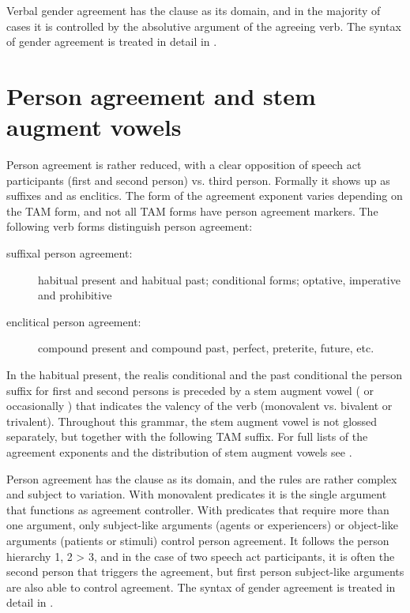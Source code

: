 Verbal gender agreement has the clause as its domain, and in the majority of cases it is controlled by the absolutive argument of the agreeing verb. The syntax of gender agreement is treated in detail in .



\section{Person agreement and stem augment vowels}
\label{sec:Stem augment vowels and person agreement}

Person agreement is rather reduced, with a clear opposition of speech act participants (first and second person) vs. third person. Formally it shows up as suffixes and as enclitics. The form of the agreement exponent varies depending on the TAM form, and not all TAM forms have person agreement markers. The following verb forms distinguish person agreement:
%
\begin{description}
	\item[suffixal person agreement:] habitual present and habitual past; conditional forms; optative, imperative and prohibitive
	\item[enclitical person agreement:] compound present and compound past, perfect, preterite, future, etc.
\end{description}
%
In the habitual present, the realis conditional and the past conditional the person suffix for first and second persons is preceded by a stem augment vowel ( or occasionally ) that indicates the valency of the verb (monovalent vs. bivalent or trivalent). Throughout this grammar, the stem augment vowel is not glossed separately, but together with the following TAM suffix. For full lists of the agreement exponents and the distribution of stem augment vowels see .

Person agreement has the clause as its domain, and the rules are rather complex and subject to variation. With monovalent predicates it is the single argument that functions as agreement controller. With predicates that require more than one argument, only subject-like arguments (agents or experiencers) or object-like arguments (patients or stimuli) control person agreement. It follows the person hierarchy 1, 2 > 3, and in the case of two speech act participants, it is often the second person that triggers the agreement, but first person subject-like arguments are also able to control agreement. The syntax of gender agreement is treated in detail in .


